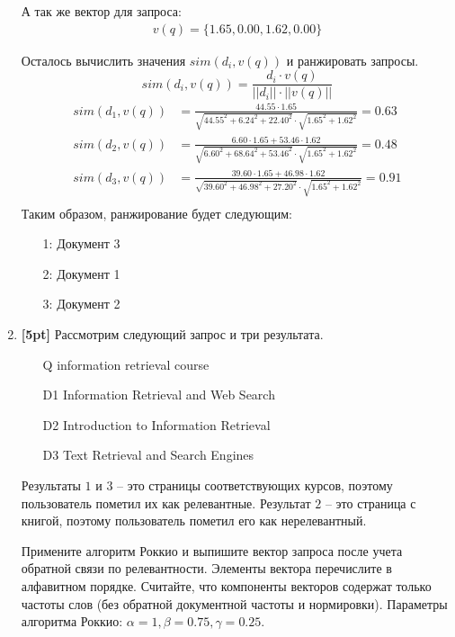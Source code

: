 \begin{enumerate}
	А так же вектор для запроса: 
	\begin{align*}
		v(q) = \{1.65, 0.00, 1.62, 0.00\}
	\end{align*}
	
	Осталось вычислить значения $sim(d_i, v(q))$ и ранжировать запросы.
	\begin{equation*}
		sim (d_i, v(q)) = \frac{d_i \cdot v(q)}{||d_i||\cdot ||v(q)||}
	\end{equation*}
	\begin{align*}
		sim(d_1, v(q)) &= \frac{44.55 \cdot 1.65}{\sqrt{44.55^2 + 6.24^2 + 22.40^2} \cdot 
				\sqrt{1.65^2 + 1.62^2}} = 0.63 \\
		sim(d_2, v(q)) &= \frac{6.60 \cdot 1.65 + 53.46\cdot 1.62}{\sqrt{6.60^2 + 68.64^2 + 
				53.46^2} \cdot \sqrt{1.65^2 + 1.62^2}} = 0.48 \\
		sim(d_3, v(q)) &= \frac{39.60 \cdot 1.65 + 46.98\cdot 1.62}{\sqrt{39.60^2 + 46.98^2 + 
				27.20^2} \cdot \sqrt{1.65^2 + 1.62^2}} = 0.91 \\
	\end{align*}
	Таким образом, ранжирование будет следующим:
	\begin{enumerate}
		\item[1:] Документ 3
		\item[2:] Документ 1
		\item[3:] Документ 2
	\end{enumerate}
	
	\item \textbf{[5pt]} Рассмотрим следующий запрос и три результата.
	\begin{enumerate}
		\item[Q] information retrieval course
		\item[D1] Information Retrieval and Web Search
		\item[D2] Introduction to Information Retrieval
		\item[D3] Text Retrieval and Search Engines
	\end{enumerate}
	
	Результаты $1$ и $3$ – это страницы соответствующих курсов, поэтому пользователь пометил их 
	как релевантные. Результат $2$ – это страница с книгой, поэтому пользователь пометил его как 
	нерелевантный.
	
	Примените алгоритм Роккио и выпишите вектор запроса после учета обратной связи по 
	релевантности. Элементы вектора перечислите в алфавитном порядке. Считайте, что компоненты 
	векторов содержат только частоты слов (без обратной документной частоты и нормировки). 
	Параметры алгоритма Роккио: $\alpha = 1, \beta = 0.75, \gamma = 0.25.$


\end{enumerate}
